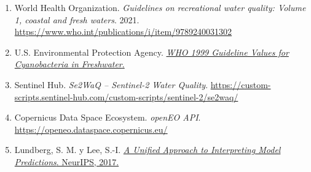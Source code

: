 \documentclass[11pt,letterpaper]{article}
\begin{document}
\begin{enumerate}
\item World Health Organization. \emph{Guidelines on recreational water quality: Volume 1, coastal and fresh waters}. 2021. \url{https://www.who.int/publications/i/item/9789240031302}
\item U.S. Environmental Protection Agency. \href{https://www.epa.gov/habs/world-health-organization-who-1999-guideline-values-cyanobacteria-freshwater}{\emph{WHO 1999 Guideline Values for Cyanobacteria in Freshwater}.}
\item Sentinel Hub. \emph{Se2WaQ -- Sentinel-2 Water Quality}. \url{https://custom-scripts.sentinel-hub.com/custom-scripts/sentinel-2/se2waq/}
\item Copernicus Data Space Ecosystem. \emph{openEO API}. \url{https://openeo.dataspace.copernicus.eu/}
\item Lundberg, S. M. y Lee, S.-I. \href{https://proceedings.neurips.cc/paper/2017/hash/8a20a8621978632d76c43dfd28b67767-Abstract.html}{\emph{A Unified Approach to Interpreting Model Predictions}. NeurIPS, 2017.}
\end{enumerate}
\end{document}
